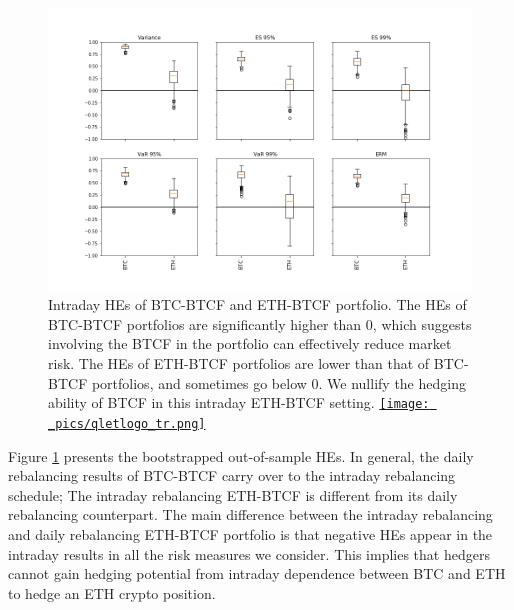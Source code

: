\documentclass[11pt,a4paper,english]{article}
\providecommand{\natp}[1]{\textcolor{darkorange}{#1}}
\begin{document}
\begin{figure}[t]
\includegraphics[width=\textwidth]{_pics/hourly_HE.png}
  \caption{Intraday HEs of BTC-BTCF and ETH-BTCF portfolio. The HEs of BTC-BTCF portfolios are significantly higher than $0$,
which suggests involving the BTCF in the portfolio can effectively reduce market risk.
The HEs of ETH-BTCF portfolios are lower than that of BTC-BTCF portfolios, and sometimes go below $0$.
We nullify the hedging ability of BTCF in this intraday ETH-BTCF setting.
  \href{http://www.quantlet.com/}{\texttt{[image: \_pics/qletlogo\_tr.png]}} }
\label{fig:HEboxplot_intraday}
\end{figure}

Figure \ref{fig:HEboxplot_intraday} presents the bootstrapped out-of-sample HEs. 
In general, the daily rebalancing results of BTC-BTCF carry over to the intraday rebalancing schedule;
The intraday rebalancing ETH-BTCF is different from its daily rebalancing counterpart.
The main difference between the intraday rebalancing and daily
rebalancing ETH-BTCF portfolio is that negative HEs appear in the
intraday results in all the risk measures we consider. 
This implies that hedgers cannot gain hedging potential from intraday dependence between BTC and ETH to hedge an ETH crypto position. 
\end{document}
